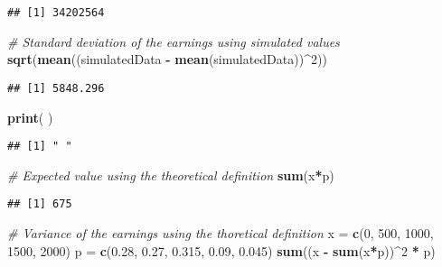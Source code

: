 \documentclass[
]{article}
\newenvironment{Shaded}{\begin{snugshade}}{\end{snugshade}}
\newcommand{\CommentTok}[1]{\textcolor[rgb]{0.56,0.35,0.01}{\textit{#1}}}
\newcommand{\DecValTok}[1]{\textcolor[rgb]{0.00,0.00,0.81}{#1}}
\newcommand{\FloatTok}[1]{\textcolor[rgb]{0.00,0.00,0.81}{#1}}
\newcommand{\FunctionTok}[1]{\textcolor[rgb]{0.13,0.29,0.53}{\textbf{#1}}}
\newcommand{\NormalTok}[1]{#1}
\newcommand{\OtherTok}[1]{\textcolor[rgb]{0.56,0.35,0.01}{#1}}
\newcommand{\SpecialCharTok}[1]{\textcolor[rgb]{0.81,0.36,0.00}{\textbf{#1}}}
\newcommand{\StringTok}[1]{\textcolor[rgb]{0.31,0.60,0.02}{#1}}
\begin{document}
\begin{verbatim}
## [1] 34202564
\end{verbatim}

\begin{Shaded}
\begin{Highlighting}[]
\CommentTok{\# Standard deviation of the earnings using simulated values}
\FunctionTok{sqrt}\NormalTok{(}\FunctionTok{mean}\NormalTok{((simulatedData }\SpecialCharTok{{-}} \FunctionTok{mean}\NormalTok{(simulatedData))}\SpecialCharTok{\^{}}\DecValTok{2}\NormalTok{))}
\end{Highlighting}
\end{Shaded}

\begin{verbatim}
## [1] 5848.296
\end{verbatim}

\begin{Shaded}
\begin{Highlighting}[]
\FunctionTok{print}\NormalTok{(}\StringTok{\textquotesingle{} \textquotesingle{}}\NormalTok{)}
\end{Highlighting}
\end{Shaded}

\begin{verbatim}
## [1] " "
\end{verbatim}

\begin{Shaded}
\begin{Highlighting}[]
\CommentTok{\# Expected value using the theoretical definition}
\FunctionTok{sum}\NormalTok{(x}\SpecialCharTok{*}\NormalTok{p)}
\end{Highlighting}
\end{Shaded}

\begin{verbatim}
## [1] 675
\end{verbatim}

\begin{Shaded}
\begin{Highlighting}[]
\CommentTok{\# Variance of the earnings using the thoretical definition}
\NormalTok{x }\OtherTok{=} \FunctionTok{c}\NormalTok{(}\DecValTok{0}\NormalTok{, }\DecValTok{500}\NormalTok{, }\DecValTok{1000}\NormalTok{, }\DecValTok{1500}\NormalTok{, }\DecValTok{2000}\NormalTok{)}
\NormalTok{p }\OtherTok{=} \FunctionTok{c}\NormalTok{(}\FloatTok{0.28}\NormalTok{, }\FloatTok{0.27}\NormalTok{, }\FloatTok{0.315}\NormalTok{, }\FloatTok{0.09}\NormalTok{, }\FloatTok{0.045}\NormalTok{)}
\FunctionTok{sum}\NormalTok{((x }\SpecialCharTok{{-}} \FunctionTok{sum}\NormalTok{(x}\SpecialCharTok{*}\NormalTok{p))}\SpecialCharTok{\^{}}\DecValTok{2} \SpecialCharTok{*}\NormalTok{ p)}
\end{Highlighting}
\end{Shaded}
\end{document}
